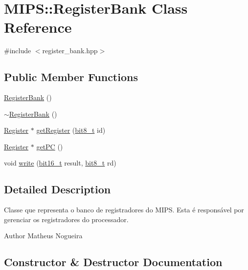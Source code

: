\hypertarget{classMIPS_1_1RegisterBank}{}\section{M\+I\+PS\+:\+:Register\+Bank Class Reference}
\label{classMIPS_1_1RegisterBank}


{\ttfamily \#include $<$register\+\_\+bank.\+hpp$>$}

\subsection*{Public Member Functions}
\begin{DoxyCompactItemize}
\item 
\hyperlink{classMIPS_1_1RegisterBank_ad30994f3b2df40a11234f4e53d820cd2}{Register\+Bank} ()
\item 
\hyperlink{classMIPS_1_1RegisterBank_ab86cb023791911b8f056870064d29245}{$\sim$\+Register\+Bank} ()
\item 
\hyperlink{classMIPS_1_1Register}{Register} $\ast$ \hyperlink{classMIPS_1_1RegisterBank_a6a7df1ec1d165a4d7273bde8caa94e45}{get\+Register} (\hyperlink{core_8hpp_a6074bae122ae7b527864eec42c728c3c}{bit8\+\_\+t} id)
\item 
\hyperlink{classMIPS_1_1Register}{Register} $\ast$ \hyperlink{classMIPS_1_1RegisterBank_a57fe0222f8176236f88f26e6a3af8ace}{get\+PC} ()
\item 
void \hyperlink{classMIPS_1_1RegisterBank_a4c6a18e903ee79d445988b92cadc3914}{write} (\hyperlink{core_8hpp_adc265a970bc35995b5879784bbb3f1b7}{bit16\+\_\+t} result, \hyperlink{core_8hpp_a6074bae122ae7b527864eec42c728c3c}{bit8\+\_\+t} rd)
\end{DoxyCompactItemize}


\subsection{Detailed Description}
Classe que representa o banco de registradores do M\+I\+PS. Esta é responsável por gerenciar os registradores do processador.

\begin{DoxyAuthor}{Author}
Matheus Nogueira 
\end{DoxyAuthor}


\subsection{Constructor \& Destructor Documentation}
